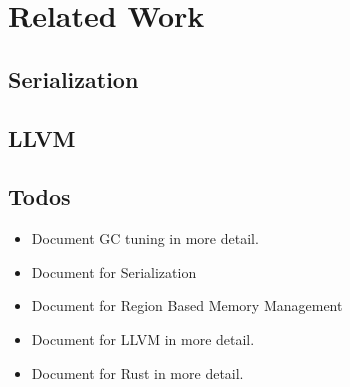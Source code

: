 \chapter{Related Work}
\label{chapter:relatedwork}
\thispagestyle{myheadings}

\graphicspath{{2_RelatedWork/Figures/}}

\label{sec:history}

\clearpage

\section{Serialization}
\label{sec:history}

\clearpage


\section{LLVM}
\label{sec:history}



\section{Todos}
\label{sec:history}
\begin{itemize}
    \item Document GC tuning in more detail.
    \item Document for Serialization
    \item Document for Region Based Memory Management
    \item Document for LLVM in more detail.
    \item Document for Rust in more detail.
\end{itemize}




